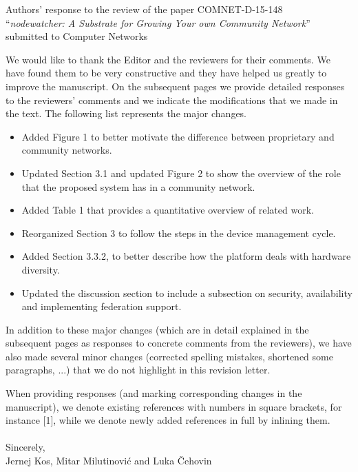 \documentclass[12pt,twoside,a4paper]{report}
\newcommand{\nodewatcher}{\textit{nodewatcher}}
\begin{document}
\pagestyle{empty}
\begin{center} {\Large{Authors' response to the review of the paper COMNET-D-15-148}}\\
    ``\emph{\nodewatcher{}: A Substrate for Growing Your own Community Network}''\\
    submitted to Computer Networks
\end{center}

\noindent We would like to thank the Editor and the reviewers for their comments. We have found them to be very constructive and they have helped us greatly to improve the manuscript. On the subsequent pages we provide detailed responses to the reviewers' comments and we indicate the modifications that we made in the text. The following list represents the major changes.
\begin{itemize}
\item Added Figure 1 to better motivate the difference between proprietary and community networks.
\item Updated Section 3.1 and updated Figure 2 to show the overview of the role that the proposed system has in a community network.
\item Added Table 1 that provides a quantitative overview of related work.
\item Reorganized Section 3 to follow the steps in the device management cycle.
\item Added Section 3.3.2, to better describe how the platform deals with hardware diversity.
\item Updated the discussion section to include a subsection on security, availability and implementing federation support.
\end{itemize}

\noindent In addition to these major changes (which are in detail explained in the subsequent pages as responses to concrete comments from the reviewers), we have also made several minor changes (corrected spelling mistakes, shortened some paragraphs, ...) that we do not highlight in this revision letter.

\noindent When providing responses (and marking corresponding changes in the manuscript), we denote existing references with numbers in square brackets, for instance [1], while we denote newly added references in full by inlining them.\\
\\
\noindent Sincerely,\\
Jernej Kos, Mitar Milutinović and Luka Čehovin
\end{document}
